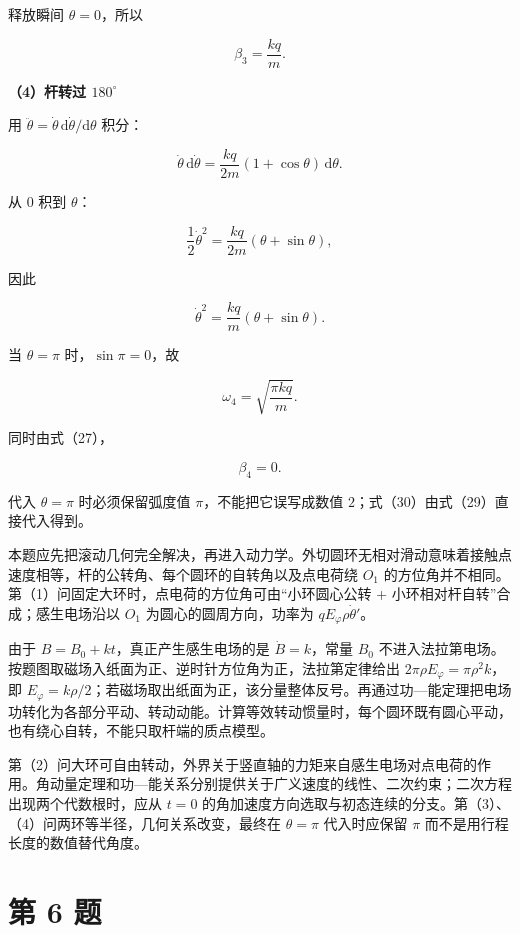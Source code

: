 \documentclass[12pt,a4paper,UTF8]{ctexart}
\begin{document}
释放瞬间 \(\theta=0\)，所以

\[\boxed{\beta_3=\frac{kq}{m}}. \tag{28}\]

\textbf{（4）杆转过 \(180^\circ\)}

用 \(\ddot\theta=\dot\theta\,\mathrm d\dot\theta/\mathrm d\theta\)
积分：

\[\dot\theta\,\mathrm d\dot\theta
=\frac{kq}{2m}(1+\cos\theta)\,\mathrm d\theta.\]

从 \(0\) 积到 \(\theta\)：

\[\frac12\dot\theta^2
=\frac{kq}{2m}(\theta+\sin\theta),\]

因此

\[\boxed{
\dot\theta^2=\frac{kq}{m}(\theta+\sin\theta)
}. \tag{29}\]

当 \(\theta=\pi\) 时，\(\sin\pi=0\)，故

\[\boxed{\omega_4=\sqrt{\frac{\pi kq}{m}}}. \tag{30}\]

同时由式（27），

\[\boxed{\beta_4=0}. \tag{31}\]

代入 \(\theta=\pi\) 时必须保留弧度值 \(\pi\)，不能把它误写成数值
\(2\)；式（30）由式（29）直接代入得到。

本题应先把滚动几何完全解决，再进入动力学。外切圆环无相对滑动意味着接触点速度相等，杆的公转角、每个圆环的自转角以及点电荷绕
\(O_1\)
的方位角并不相同。第（1）问固定大环时，点电荷的方位角可由``小环圆心公转
+ 小环相对杆自转''合成；感生电场沿以 \(O_1\) 为圆心的圆周方向，功率为
\(qE_\varphi\rho\dot\theta'\)。

由于 \(B=B_0+kt\)，真正产生感生电场的是 \(\dot B=k\)，常量 \(B_0\)
不进入法拉第电场。按题图取磁场入纸面为正、逆时针方位角为正，法拉第定律给出
\(2\pi\rho E_\varphi=\pi\rho^2k\)，即
\(E_\varphi=k\rho/2\)；若磁场取出纸面为正，该分量整体反号。再通过功---能定理把电场功转化为各部分平动、转动动能。计算等效转动惯量时，每个圆环既有圆心平动，也有绕心自转，不能只取杆端的质点模型。

第（2）问大环可自由转动，外界关于竖直轴的力矩来自感生电场对点电荷的作用。角动量定理和功---能关系分别提供关于广义速度的线性、二次约束；二次方程出现两个代数根时，应从
\(t=0\)
的角加速度方向选取与初态连续的分支。第（3）、（4）问两环等半径，几何关系改变，最终在
\(\theta=\pi\) 代入时应保留 \(\pi\) 而不是用行程长度的数值替代角度。

\newpage

\section{第 6 题}\label{ux7b2c-6-ux9898}
\end{document}
